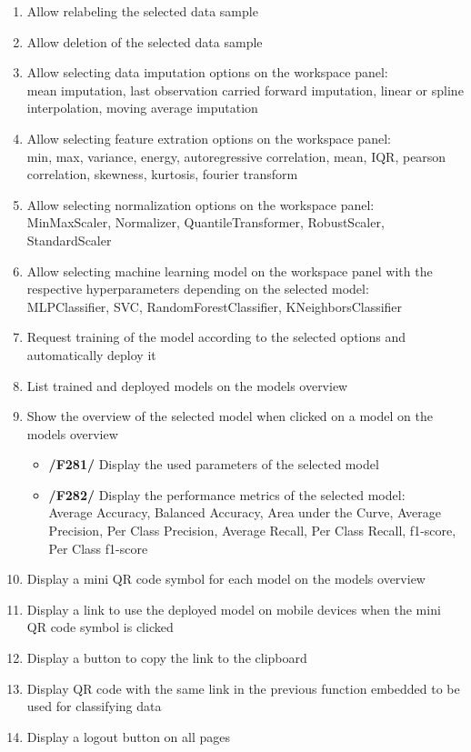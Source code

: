 \begin{enumerate}[{label = \textbf{/F{\protect\twodigits{\arabic{enumi}}}0/}, leftmargin = *}]
    \item Allow relabeling the selected data sample
    \item Allow deletion of the selected data sample
    \item Allow selecting data imputation options on the workspace panel: \\mean imputation, last observation carried forward imputation, linear or spline interpolation, moving average imputation
    \item Allow selecting feature extration options on the workspace panel: \\min, max, variance, energy, autoregressive correlation, mean, IQR, pearson correlation, skewness, kurtosis, fourier transform
    \item Allow selecting normalization options on the workspace panel: \\MinMaxScaler, Normalizer, QuantileTransformer, RobustScaler, StandardScaler
    \item Allow selecting machine learning model on the workspace panel with the respective hyperparameters depending on the selected model: \\MLPClassifier, SVC, RandomForestClassifier, KNeighborsClassifier
    \item Request training of the model according to the selected options and automatically deploy it
    \item List trained and deployed models on the models overview
    \item Show the overview of the selected model when clicked on a model on the models overview
    \begin{itemize}
        \item \textbf{/F281/} Display the used parameters of the selected model
        \item \textbf{/F282/} Display the performance metrics of the selected model: \\Average Accuracy, Balanced Accuracy, Area under the Curve, Average Precision, Per Class Precision, Average Recall, Per Class Recall, f1-score, Per Class f1-score
    \end{itemize}
    \item Display a mini QR code symbol for each model on the models overview
    \item Display a link to use the deployed model on mobile devices when the mini QR code symbol is clicked
    \item Display a button to copy the link to the clipboard
    \item Display QR code with the same link in the previous function embedded to be used for classifying data
    \item Display a logout button on all pages
\end{enumerate}

